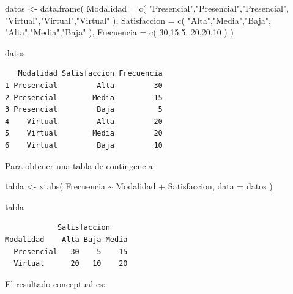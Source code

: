 \documentclass[
  spanish,
  14pt,
  letterpaper,
  DIV=11,
  numbers=noendperiod]{scrartcl}
\newenvironment{Shaded}{\begin{snugshade}}{\end{snugshade}}
\newcommand{\AttributeTok}[1]{\textcolor[rgb]{0.98,0.15,0.45}{#1}}
\newcommand{\DecValTok}[1]{\textcolor[rgb]{0.68,0.51,1.00}{#1}}
\newcommand{\FunctionTok}[1]{\textcolor[rgb]{0.65,0.89,0.18}{#1}}
\newcommand{\NormalTok}[1]{\textcolor[rgb]{0.97,0.97,0.95}{#1}}
\newcommand{\OtherTok}[1]{\textcolor[rgb]{0.65,0.89,0.18}{#1}}
\newcommand{\SpecialCharTok}[1]{\textcolor[rgb]{0.68,0.51,1.00}{#1}}
\newcommand{\StringTok}[1]{\textcolor[rgb]{0.90,0.86,0.45}{#1}}
\begin{document}
\begin{Shaded}
\begin{Highlighting}[]
\NormalTok{datos }\OtherTok{\textless{}{-}} \FunctionTok{data.frame}\NormalTok{(}
  \AttributeTok{Modalidad =} \FunctionTok{c}\NormalTok{(}
    \StringTok{"Presencial"}\NormalTok{,}\StringTok{"Presencial"}\NormalTok{,}\StringTok{"Presencial"}\NormalTok{,}
    \StringTok{"Virtual"}\NormalTok{,}\StringTok{"Virtual"}\NormalTok{,}\StringTok{"Virtual"}
\NormalTok{  ),}
  \AttributeTok{Satisfaccion =} \FunctionTok{c}\NormalTok{(}
    \StringTok{"Alta"}\NormalTok{,}\StringTok{"Media"}\NormalTok{,}\StringTok{"Baja"}\NormalTok{,}
    \StringTok{"Alta"}\NormalTok{,}\StringTok{"Media"}\NormalTok{,}\StringTok{"Baja"}
\NormalTok{  ),}
  \AttributeTok{Frecuencia =} \FunctionTok{c}\NormalTok{(}
    \DecValTok{30}\NormalTok{,}\DecValTok{15}\NormalTok{,}\DecValTok{5}\NormalTok{,}
    \DecValTok{20}\NormalTok{,}\DecValTok{20}\NormalTok{,}\DecValTok{10}
\NormalTok{  )}
\NormalTok{)}

\NormalTok{datos}
\end{Highlighting}
\end{Shaded}

\begin{verbatim}
   Modalidad Satisfaccion Frecuencia
1 Presencial         Alta         30
2 Presencial        Media         15
3 Presencial         Baja          5
4    Virtual         Alta         20
5    Virtual        Media         20
6    Virtual         Baja         10
\end{verbatim}

Para obtener una tabla de contingencia:

\begin{Shaded}
\begin{Highlighting}[]
\NormalTok{tabla }\OtherTok{\textless{}{-}} \FunctionTok{xtabs}\NormalTok{(}
\NormalTok{  Frecuencia }\SpecialCharTok{\textasciitilde{}}\NormalTok{ Modalidad }\SpecialCharTok{+}\NormalTok{ Satisfaccion,}
  \AttributeTok{data =}\NormalTok{ datos}
\NormalTok{)}

\NormalTok{tabla}
\end{Highlighting}
\end{Shaded}

\begin{verbatim}
            Satisfaccion
Modalidad    Alta Baja Media
  Presencial   30    5    15
  Virtual      20   10    20
\end{verbatim}

El resultado conceptual es:
\end{document}
